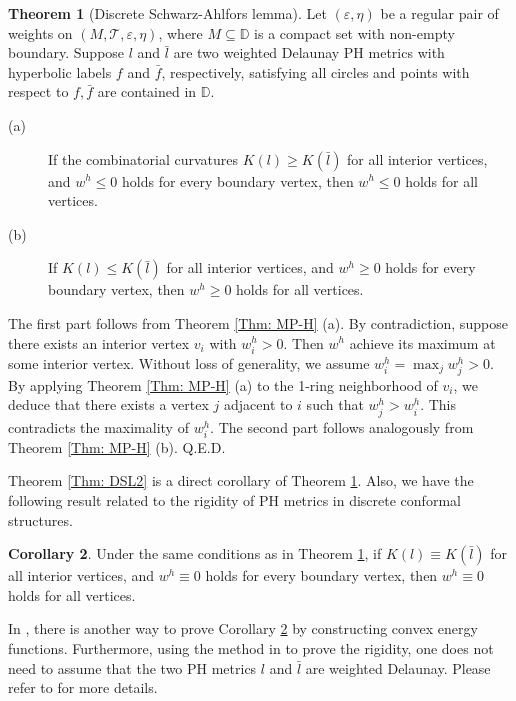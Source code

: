 \documentclass[12pt]{amsart}
\theoremstyle{definition}
\newtheorem{theorem}{Theorem}[section]
\newtheorem{corollary}[theorem]{Corollary}
\def\qed{\hfill{Q.E.D.}\smallskip}
\begin{document}
\begin{theorem}[Discrete Schwarz-Ahlfors lemma]\label{Thm: DSL}
Let $(\varepsilon,\eta)$ be a regular pair of weights on $(M,\mathcal{T},\varepsilon,\eta)$, where $M\subseteq\mathbb{D}$ is a compact set with non-empty boundary.
Suppose $l$ and $\bar{l}$ are two weighted Delaunay PH metrics with hyperbolic labels $f$ and $\bar{f}$, respectively, satisfying all circles and points with respect to $f,\bar f$ are contained in $\mathbb{D}$.
\begin{description}
\item[(a)] If the combinatorial curvatures $K(l)\geq K(\bar{l})$ for all interior vertices, and $w^h \leq 0$ holds for every boundary vertex, then $w^h \leq 0$ holds for all vertices.
\item[(b)] If $K(l)\leq K(\bar{l})$ for all interior vertices, and $w^h \geq 0$ holds for every boundary vertex, then $w^h \geq 0$ holds for all vertices.
\end{description}
\end{theorem}
\proof
The first part follows from Theorem \ref{Thm: MP-H} (a). By contradiction, suppose there exists an interior vertex $v_i$ with $w^h_i>0$. Then $w^h$ achieve its maximum at some interior vertex.  Without loss of generality, we assume $w^h_i=\max_{j} w^h_j >0$.
By applying Theorem \ref{Thm: MP-H} (a) to the 1-ring neighborhood of $v_i$,
we deduce that there exists a vertex $j$ adjacent to $i$ such that $w^h_j>w^h_i$.
This contradicts the maximality of $w^h_i$.
The second part follows analogously from Theorem \ref{Thm: MP-H} (b).
\qed

Theorem \ref{Thm: DSL2} is a direct corollary of Theorem \ref{Thm: DSL}. Also, we have the following result related to the rigidity of PH metrics in discrete conformal structures.  
\begin{corollary}\label{rigidity of HDCF}
Under the same conditions as in Theorem \ref{Thm: DSL}, if $K(l)\equiv K(\bar{l})$ for all interior vertices, and $w^h\equiv 0$ holds for every boundary vertex, then $w^h\equiv0$ holds for all vertices.
\end{corollary}


In \cite{Xu 1}, there is another way to prove Corollary \ref{rigidity of HDCF} by constructing convex energy functions. Furthermore, using the method in \cite{Xu 1} to prove the rigidity, one does not
need to assume that the two PH metrics $l$ and $\bar{l}$ are weighted Delaunay. Please refer to \cite{Xu 1} for more details.
\end{document}
